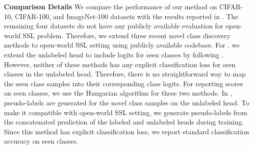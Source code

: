 \documentclass[runningheads]{eccv2022submission}
\begin{document}
\vspace{1mm}
\noindent \textbf{Comparison Details} We compare the performance of our method on CIFAR-10, CIFAR-100, and ImageNet-100 datasets with the results reported in \cite{cao2022openworld}. The remaining four datasets do not have any publicly available evaluation for open-world SSL problem. Therefore, we extend three recent novel class discovery methods \cite{Han2020Automatically,han2019learning,fini2021unified} to open-world SSL setting using publicly available codebase. For \cite{Han2020Automatically,han2019learning}, we extend the unlabeled head to include logits for seen classes by following \cite{cao2022openworld}. However, neither of these methods has any explicit classification loss for seen classes in the unlabeled head. Therefore, there is no straightforward way to map the seen class samples into their corresponding class logits. For reporting scores on seen classes, we use the Hungarian algorithm for these two methods. In \cite{fini2021unified}, pseudo-labels are generated for the novel class samples on the unlabeled head. To make it compatible with open-world SSL setting, we generate pseudo-labels from the concatenated prediction of the labeled and unlabeled heads during training. Since this method has explicit classification loss, we report standard classification accuracy on seen classes.      
\end{document}

